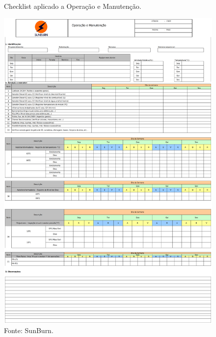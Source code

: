   
  \begin{figure}[H]
    \caption{Checklist aplicado a Operação e Manutenção.} %
    \includegraphics[width=1\textwidth]{images/checklist_aplicacao.png}
    \caption*{Fonte: SunBurn.}
    \label{fig:checklist_aplicacao}
  \end{figure}
  